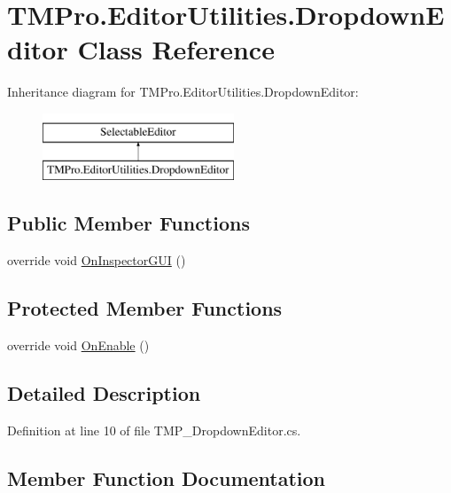 \hypertarget{class_t_m_pro_1_1_editor_utilities_1_1_dropdown_editor}{}\section{T\+M\+Pro.\+Editor\+Utilities.\+Dropdown\+Editor Class Reference}
\label{class_t_m_pro_1_1_editor_utilities_1_1_dropdown_editor}
Inheritance diagram for T\+M\+Pro.\+Editor\+Utilities.\+Dropdown\+Editor\+:\begin{figure}[H]
\begin{center}
\leavevmode
\includegraphics[height=2.000000cm]{class_t_m_pro_1_1_editor_utilities_1_1_dropdown_editor}
\end{center}
\end{figure}
\subsection*{Public Member Functions}
\begin{DoxyCompactItemize}
\item 
override void \mbox{\hyperlink{class_t_m_pro_1_1_editor_utilities_1_1_dropdown_editor_a1f54d782eb4d6a0bb713f54636d6138e}{On\+Inspector\+G\+UI}} ()
\end{DoxyCompactItemize}
\subsection*{Protected Member Functions}
\begin{DoxyCompactItemize}
\item 
override void \mbox{\hyperlink{class_t_m_pro_1_1_editor_utilities_1_1_dropdown_editor_a367aa2bcb4b5686af9b5cf9b26528573}{On\+Enable}} ()
\end{DoxyCompactItemize}


\subsection{Detailed Description}


Definition at line 10 of file T\+M\+P\+\_\+\+Dropdown\+Editor.\+cs.



\subsection{Member Function Documentation}
\mbox{\label{class_t_m_pro_1_1_editor_utilities_1_1_dropdown_editor_a367aa2bcb4b5686af9b5cf9b26528573}} 
